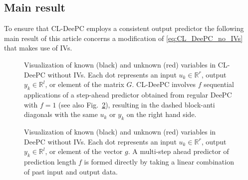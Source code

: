 \subsection{Main result}
\noindent To ensure that \ac{CL-DeePC} employs a consistent output predictor the following main result of this article concerns a modification of \eqref{eq:CL_DeePC_no_IVs} that makes use of \ac{IVs}.
\begin{figure}[b!]
\centering

\caption{Visualization of known (black) and unknown (red) variables in \ac{CL-DeePC} without \ac{IVs}. Each dot represents an input $u_k\in\mathbb{R}^r$, output $y_k\in\mathbb{R}^l$, or element of the matrix $G$. \ac{CL-DeePC} involves $f$ sequential applications of a step-ahead predictor obtained from regular \ac{DeePC} with $f=1$ (see also Fig.~\ref{fig:regular-DeePC}), resulting in the dashed block-anti diagonals with the same $u_k$ or $y_k$ on the right hand side.}
\label{fig:CL-DeePC}
\end{figure}
\begin{figure}[b!]
\centering

\caption{Visualization of known (black) and unknown (red) variables in \ac{DeePC} without \ac{IVs}. Each dot represents an input $u_k\in\mathbb{R}^r$, output $y_k\in\mathbb{R}^l$, or element of the vector $g$. A multi-step ahead predictor of prediction length $f$ is formed directly by taking a linear combination of past input and output data.\\\vspace{0.75mm}}
\label{fig:regular-DeePC}
\end{figure}
%
\setcounter{thm}{0}
